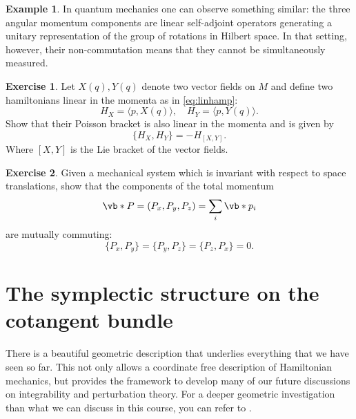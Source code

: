 \documentclass[english,fontsize=11pt,paper=b5]{scrbook}
\numberwithin{equation}{chapter}
\theoremstyle{definition}
\newtheorem{example}{Example}[chapter]
\newtheorem{exercise}{Exercise}[chapter]
\begin{document}
\begin{example}
      In quantum mechanics one can observe something similar: the three angular momentum components are linear self-adjoint operators generating a unitary representation of the group of rotations in Hilbert space.
      In that setting, however, their non-commutation means that they cannot be simultaneously measured.
    \end{example}

    \begin{exercise}
      Let $X(q), Y(q)$ denote two vector fields on $M$ and define two hamiltonians linear in the momenta as in \eqref{eq:linhamp}:
      \begin{equation}
        H_X = \langle p, X(q)\rangle,\quad H_Y = \langle p, Y(q) \rangle.
      \end{equation}
      Show that their Poisson bracket is also linear in the momenta and is given by
      \begin{equation}
        \big\{H_X, H_Y\big\} = - H_{[X,Y]}.
      \end{equation}
      Where $[X,Y]$ is the Lie bracket of the vector fields.
    \end{exercise}

    \begin{exercise}
      Given a mechanical system which is invariant with respect to space translations, show that the components of the total momentum
      \begin{equation}
        \vb* P = (P_x, P_y, P_z) = \sum_i \vb*{p}_i
      \end{equation}
      are mutually commuting:
      \begin{equation}
        \big\{P_x, P_y\big\}
        =\big\{P_y, P_z\big\}
        =\big\{P_z, P_x\big\}
        =0.
      \end{equation}
    \end{exercise}

    \section{The symplectic structure on the cotangent bundle}

    There is a beautiful geometric description that underlies everything that we have seen so far.
    This not only allows a coordinate free description of Hamiltonian mechanics, but provides the framework to develop many of our future discussions on integrability and perturbation theory.
    For a deeper geometric investigation than what we can discuss in this course, you can refer to \cite{book:dasilva}.
\end{document}
